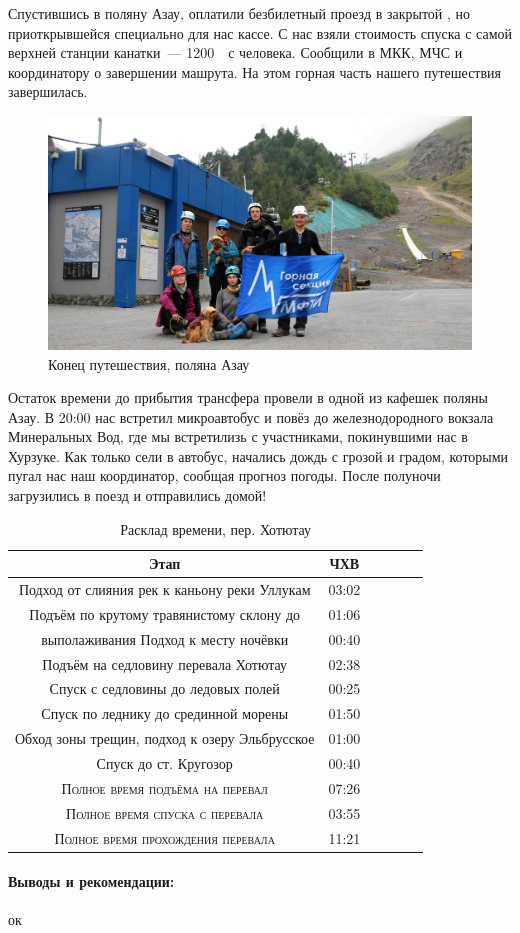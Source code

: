 Спустившись в поляну Азау, оплатили безбилетный проезд в закрытой , но приоткрывшейся специально для нас кассе. С нас взяли стоимость спуска с самой верхней станции канатки~--- 1200~\faRub~с человека. Сообщили в МКК, МЧС и координатору о завершении машрута. На этом горная часть нашего путешествия завершилась.

\begin{figure}[h!]
	\centering
	\includegraphics[width=0.7\linewidth]{../pics/group_finish.jpg}
	\caption{Конец путешествия, поляна Азау}
	\label{fig:group_finish}
\end{figure}

Остаток времени до прибытия трансфера провели в одной из кафешек поляны Азау.
В 20:00 нас встретил микроавтобус и повёз до железнодородного вокзала Минеральных Вод, где мы встретилизь с участниками, покинувшими нас в Хурзуке. Как только сели в автобус, начались дождь с грозой и градом, которыми пугал нас наш координатор, сообщая прогноз погоды. После полуночи загрузились в поезд и отправились домой!


\begin{table}[h!]
	\centering
	\begin{tabular}{|c|c|c|c|c|c|} 
		\hline 
		Этап & ЧХВ \\ 	
		\hline 
		Подход от слияния рек к каньону реки Уллукам		& 03:02\\
		Подъём по крутому травянистому склону до& 01:06 \\ выполаживания 
		Подход к месту ночёвки & 00:40 \\
		Подъём на седловину перевала Хотютау & 02:38\\
		Спуск с седловины до ледовых полей& 00:25\\
		Спуск по леднику до срединной морены & 01:50\\
		Обход зоны трещин, подход к озеру Эльбрусское& 01:00\\
		Спуск до ст. Кругозор & 00:40 \\
			
		\hline
		\textsc{Полное время подъёма на перевал  }& 07:26\\
		\textsc{Полное время спуска с перевала }& 03:55 \\
		\textsc{Полное время прохождения перевала }& 11:21 \\
		\hline
	\end{tabular}
	\caption{Расклад времени, пер. Хотютау}
\end{table}

\paragraph{Выводы и рекомендации:} ок


\clearpage